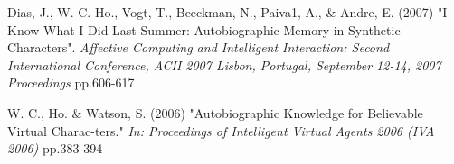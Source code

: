 \documentclass{sig-alternate-05-2015}
\begin{document}
\begin{thebibliography}{20}
Dias, J., W. C. Ho., Vogt, T., Beeckman, N., Paiva1, A., \& Andre, E. (2007)
"I Know What I Did Last Summer: Autobiographic Memory in Synthetic Characters".
\textit{Affective Computing and Intelligent Interaction: Second International Conference, ACII 2007 Lisbon, Portugal, September 12-14, 2007 Proceedings} pp.606-617

W. C., Ho. \& Watson, S. (2006) 
"Autobiographic Knowledge for Believable Virtual Charac-ters." 
\textit{In: Proceedings of Intelligent Virtual Agents 2006 (IVA 2006)} pp.383-394



\end{thebibliography}
 
\end{document}
